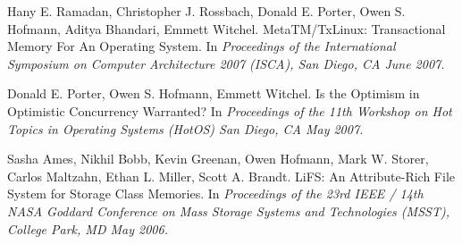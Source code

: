 \begin{bibsection}
\item Hany E. Ramadan, Christopher J. Rossbach, Donald E. Porter, Owen S.
Hofmann, Aditya Bhandari, Emmett Witchel.
MetaTM/TxLinux: Transactional Memory For An Operating System.
In \emph{Proceedings of the International Symposium on Computer
Architecture 2007 (ISCA), San Diego, CA June 2007.} 
 
\item Donald E. Porter, Owen S. Hofmann, Emmett Witchel.
Is the Optimism in Optimistic Concurrency Warranted? 
In \emph{Proceedings of the 11th Workshop on Hot Topics in Operating
Systems (HotOS) San Diego, CA May 2007.} 
 
\item Sasha Ames, Nikhil Bobb, Kevin Greenan, Owen Hofmann, Mark W. Storer,
Carlos Maltzahn, Ethan L. Miller, Scott A. Brandt.
LiFS: An Attribute-Rich File System for Storage Class Memories.
In \emph{Proceedings of the 23rd IEEE / 14th NASA Goddard Conference on
Mass Storage Systems and Technologies (MSST), College Park, MD May
2006.} 
\end{bibsection}

